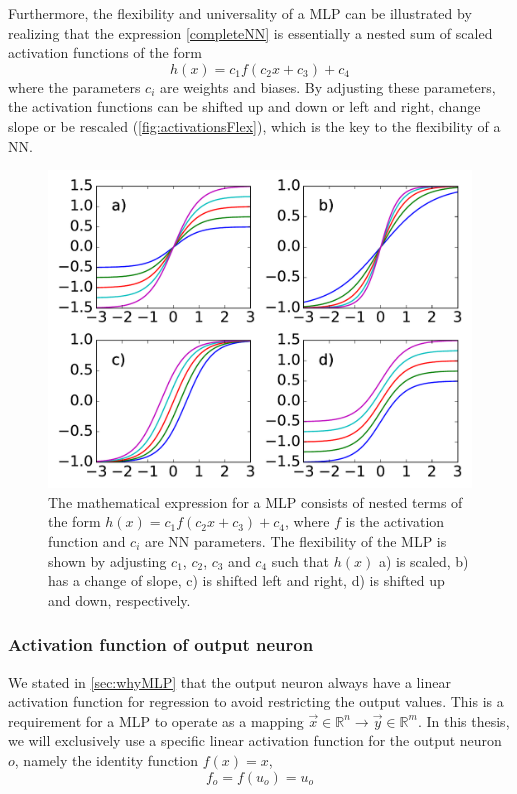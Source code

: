 \documentclass[twoside,english]{uiofysmaster}
\begin{document}
Furthermore, the flexibility and universality of a MLP can be illustrated by realizing that 
the expression \eqref{completeNN} is essentially a nested sum of scaled activation functions of the form
\begin{equation}
 h(x) = c_1 f(c_2 x + c_3) + c_4
\end{equation}
where the parameters $c_i$ are weights and biases. By adjusting these parameters, the activation functions
can be shifted up and down or left and right, change slope or be rescaled (\autoref{fig:activationsFlex}), 
which is the key to the flexibility of a NN. 
\begin{figure}
\begin{center}
  \includegraphics[width = 0.9\linewidth]{Figures/Theory/activationFlex.pdf}
  \caption{The mathematical expression for a MLP consists of nested terms of the form $h(x) = c_1 f(c_2 x + c_3) + c_4$, 
	   where $f$ is the activation function
	    and $c_i$ are NN parameters. The flexibility of the MLP is shown by adjusting $c_1$, $c_2$, $c_3$ and $c_4$ such that
	    $h(x)$
	    a) is scaled, b) has a change of slope, c) is shifted left and right, d) is shifted up and down, respectively.}
  \label{fig:activationsFlex}
  \end{center}
\end{figure}

\subsubsection{Activation function of output neuron}
We stated in \autoref{sec:whyMLP} that the output neuron always have a linear activation function for regression to avoid
restricting the output values. This is a requirement for a MLP to operate as a mapping 
$\vec{x} \in \mathbb{R}^n \rightarrow \vec{y} \in \mathbb{R}^m$. In this thesis, we will exclusively use a
specific linear activation function for the output neuron $o$, namely the identity function $f(x) = x$,
\begin{equation}
 f_o = f(u_o) = u_o
\end{equation}
\end{document}
